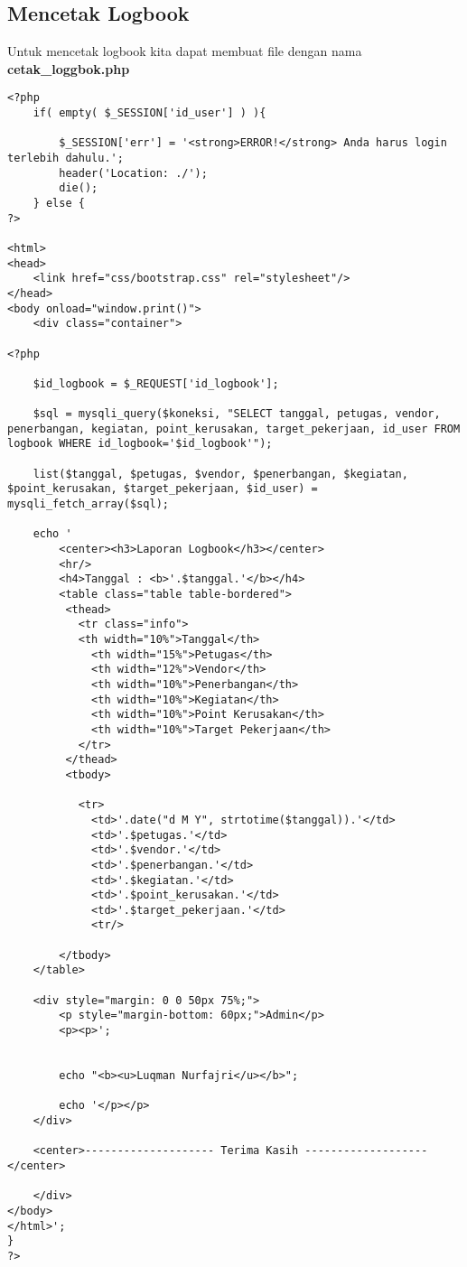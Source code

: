 \subsection{Mencetak Logbook}
Untuk mencetak logbook kita dapat membuat file dengan nama \textbf{cetak\_loggbok.php}
\begin{lstlisting}
<?php
    if( empty( $_SESSION['id_user'] ) ){

    	$_SESSION['err'] = '<strong>ERROR!</strong> Anda harus login terlebih dahulu.';
    	header('Location: ./');
    	die();
    } else {
?>

<html>
<head>
    <link href="css/bootstrap.css" rel="stylesheet"/>
</head>
<body onload="window.print()">
    <div class="container">

<?php

    $id_logbook = $_REQUEST['id_logbook'];

    $sql = mysqli_query($koneksi, "SELECT tanggal, petugas, vendor, penerbangan, kegiatan, point_kerusakan, target_pekerjaan, id_user FROM logbook WHERE id_logbook='$id_logbook'");

    list($tanggal, $petugas, $vendor, $penerbangan, $kegiatan, $point_kerusakan, $target_pekerjaan, $id_user) = mysqli_fetch_array($sql);

    echo '
        <center><h3>Laporan Logbook</h3></center>
        <hr/>
        <h4>Tanggal : <b>'.$tanggal.'</b></h4>
        <table class="table table-bordered">
         <thead>
           <tr class="info">
           <th width="10%">Tanggal</th>
             <th width="15%">Petugas</th>
             <th width="12%">Vendor</th>
             <th width="10%">Penerbangan</th>
             <th width="10%">Kegiatan</th>
             <th width="10%">Point Kerusakan</th>
             <th width="10%">Target Pekerjaan</th>
           </tr>
         </thead>
         <tbody>

           <tr>
             <td>'.date("d M Y", strtotime($tanggal)).'</td>
             <td>'.$petugas.'</td>
             <td>'.$vendor.'</td>
             <td>'.$penerbangan.'</td>
             <td>'.$kegiatan.'</td>
             <td>'.$point_kerusakan.'</td>
             <td>'.$target_pekerjaan.'</td>
             <tr/>

        </tbody>
    </table>

    <div style="margin: 0 0 50px 75%;">
        <p style="margin-bottom: 60px;">Admin</p>
        <p><p>';

        
        echo "<b><u>Luqman Nurfajri</u></b>";

        echo '</p></p>
    </div>

    <center>-------------------- Terima Kasih ------------------- </center>

    </div>
</body>
</html>';
}
?>
\end{lstlisting}
